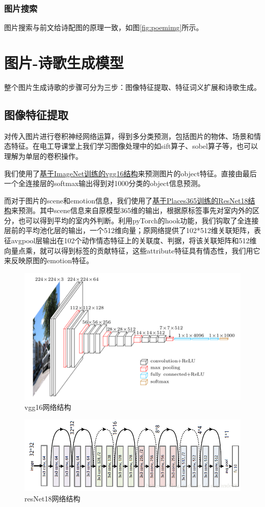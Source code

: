 \documentclass[a4paper, 10pt]{article}
\begin{document}
\subsubsection{图片搜索}
图片搜索与前文给诗配图的原理一致，如图\ref{fig:poemimg}所示。

\section{图片-诗歌生成模型}
整个图片生成诗歌的步骤可分为三步：图像特征提取、特征词义扩展和诗歌生成。

\subsection{图像特征提取}
对传入图片进行卷积神经网络运算，得到多分类预测，包括图片的物体、场景和情态特征。在电工导课堂上我们学习图像处理中的如sift算子、sobel算子等，也可以理解为单层的卷积操作。

我们使用了\href{http://www.cs.toronto.edu/~frossard/post/vgg16/}{基于ImageNet训练的vgg16结构}来预测图片的object特征。直接由最后一个全连接层的softmax输出得到对1000分类的object信息预测。

而对于图片的scene和emotion信息，我们使用了\href{http://places2.csail.mit.edu/PAMI_places.pdf}{基于Places365训练的ResNet18结构}来预测。其中scene信息来自原模型365维的输出，根据原标签事先对室内外的区分，也可以得到平均的室内外判断。利用pyTorch的hook功能，我们钩取了全连接层前的平均池化层的输出，一个512维向量；原网络提供了102*512维关联矩阵，表征avgpool层输出在102个动作情态特征上的关联度、判据，将该关联矩阵和512维向量点乘，就可以得到标签的贡献特征，这些attribute特征具有情态性，我们用它来反映原图的emotion特征。

\begin{figure}[H]
\centering
\includegraphics[width=0.6\linewidth]{imgs/1.png}
\caption{vgg16网络结构}
\end{figure}
\begin{figure}[H]
\centering
\includegraphics[width=0.6\linewidth]{imgs/2.png}
\caption{resNet18网络结构}
\end{figure}
\end{document}
